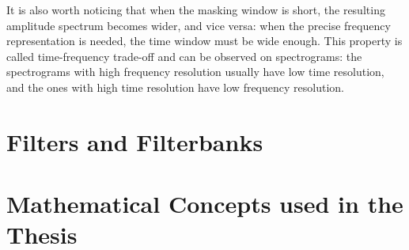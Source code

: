 It is also worth noticing that when the masking window is short, the resulting amplitude spectrum becomes wider, and vice versa: when the precise frequency representation is needed, the time window must be wide enough. This property is called time-frequency trade-off and can be observed on spectrograms: the spectrograms with high frequency resolution usually have low time resolution, and the ones with high time resolution have low frequency resolution.

\section{Filters and Filterbanks}\label{section:math_filters}


\section{Mathematical Concepts used in the Thesis}\label{section:math_concepts}

